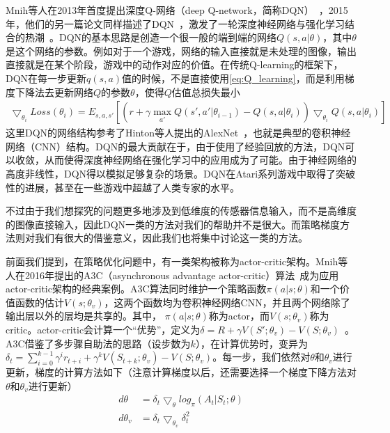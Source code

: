       Mnih等人在2013年首度提出深度Q-网络（deep Q-network，简称DQN）~\cite{atari_2013}，2015年，他们的另一篇论文同样描述了DQN~\cite{nature2015}，激发了一轮深度神经网络与强化学习结合的热潮~\cite{deepRL_overview}。DQN的基本思路是创造一个很一般的端到端的网络$Q(s, a | \theta)$，其中$\theta$是这个网络的参数。例如对于一个游戏，网络的输入直接就是未处理的图像，输出直接就是在某个阶段，游戏中的动作对应的价值。在传统Q-learning的框架下，DQN在每一步更新$q(s, a)$值的时候，不是直接使用\eqref{eq:Q_learning}，而是利用梯度下降法去更新网络$Q$的参数$\theta$，使得$Q$估值总损失最小
      \begin{align*}
        \bigtriangledown_{\theta_i}Loss(\theta_i) = E_{s, a, s'}[(r+\gamma \max_{a'}Q(s', a'|\theta_{i-1}) - Q(s, a|\theta_i))\bigtriangledown_{\theta_i}Q(s, a|\theta_i)]
      \end{align*}
      这里DQN的网络结构参考了Hinton等人提出的AlexNet~\cite{AlexNet}，也就是典型的卷积神经网络（CNN）结构。DQN的最大贡献在于，由于使用了经验回放的方法，DQN可以收敛，从而使得深度神经网络在强化学习中的应用成为了可能。由于神经网络的高度非线性，DQN得以模拟足够复杂的场景。DQN在Atari系列游戏中取得了突破性的进展，甚至在一些游戏中超越了人类专家的水平。\par
      不过由于我们想探究的问题更多地涉及到低维度的传感器信息输入，而不是高维度的图像直接输入，因此DQN一类的方法对我们的帮助并不是很大。而策略梯度方法则对我们有很大的借鉴意义，因此我们也将集中讨论这一类的方法。\par
      前面我们提到，在策略优化问题中，有一类架构被称为actor-critic架构。Mnih等人在2016年提出的A3C（asynchronous advantage actor-critic）算法~\cite{A3C}成为应用actor-critic架构的经典案例。A3C算法同时维护一个策略函数$\pi(a|s; \theta)$和一个价值函数的估计$V(s; \theta_v )$，这两个函数均为卷积神经网络CNN，并且两个网络除了输出层以外的层均是共享的。其中， $\pi(a|s; \theta)$称为actor，而$V(s; \theta_v )$称为critic。actor-critic会计算一个``优势''，定义为$\delta = R + \gamma V(S'; \theta_v) - V(S; \theta_v)$~\cite{Sutton_book}。A3C借鉴了多步骤自助法的思路（设步数为$k$），在计算优势时，变异为$\delta_t = \sum_{i = 0}^{k - 1}\gamma^i r_{t+i} + \gamma^k V(S_{t+k}; \theta_v) - V(S; \theta_v)$。每一步，我们依然对$\theta$和$\theta_v$进行更新，梯度的计算方法如下（注意计算梯度以后，还需要选择一个梯度下降方法对$\theta$和$\theta_v$进行更新）
      \begin{align}
      \label{eq:A3C_gradient1}
          d\theta &= \delta_t \bigtriangledown_{\theta} log_\pi(A_t|S_t; \theta)\\
      \label{eq:A3C_gradient2}
          d\theta_v &= \delta_t \bigtriangledown_{\theta_v} \delta_t^2
      \end{align}
